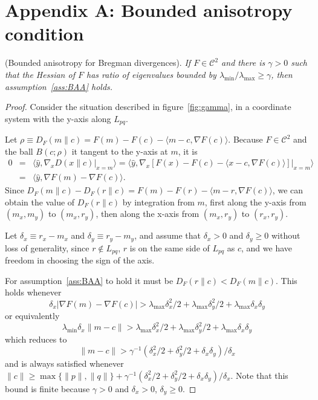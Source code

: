 \documentclass[11pt]{article}
\newcommand{\D}[2]{D\left(#1 \parallel #2\right)}
\begin{document}








\section*{Appendix A: Bounded anisotropy condition}\label{app:gamma}


 (Bounded anisotropy for Bregman divergences).
\emph{
If $F\in\mathcal{C}^2$ and there is $\gamma > 0$ such that the Hessian of $F$ has ratio of eigenvalues bounded by $\lambda_{\text{min}}/\lambda_{\text{max}}\ge \gamma$,
	then assumption~\ref{ass:BAA} holds. 
}\begin{proof}
Consider the situation described in figure~\ref{fig:gamma}, 
	in a coordinate system with the y-axis along $L_{pq}$. 

Let $\rho\equiv D_F(m\parallel c) = F(m)-F(c)-\langle m-c,\nabla F(c)\rangle$. 
Because $F\in\mathcal{C}^2$ and the ball $B(c;\rho)$ it tangent to the y-axis at $m$, 
	it is 
\begin{eqnarray*}
	0 &=& \langle \hat{y}, \nabla_x \D{x}{c}\bigg|_{x=m}\rangle = \langle \hat{y}, \nabla_x \left[ F(x) - F(c) - \langle x-c, \nabla F(c) \rangle \right]\bigg|_{x=m} \rangle \\
	   &=& \langle \hat{y}, \nabla F(m) - \nabla F(c) \rangle.
\end{eqnarray*}
Since $D_F(m\parallel c) - D_F(r\parallel c) = F(m)-F(r) - \langle m-r,\nabla F(c)\rangle$, 
we can obtain the value of $D_F(r\parallel c)$ by integration from $m$, first 
	along the y-axis from $(m_x,m_y)$ to $(m_x,r_y)$, 
	then along the x-axis from $(m_x,r_y)$ to $(r_x,r_y)$. 

Let $\delta_x\equiv r_x-m_x$ and $\delta_y\equiv r_y-m_y$, 
	and assume that $\delta_x> 0$ and $\delta_y\ge 0$ without loss of generality, 
	since $r\not\in L_{pq}$, $r$ is on the same side of $L_{pq}$ as $c$, 
	and we have freedom in choosing the sign of the axis. 

For assumption~\ref{ass:BAA} to hold it must be $D_F(r\parallel c) < D_F(m\parallel c)$. This holds whenever
\[
	\delta_x |\nabla F(m)-\nabla F(c)| > 
		\lambda_{\text{max}} \delta_x^2 / 2 + \lambda_{\text{max}}\delta_y^2 / 2 + \lambda_{\text{max}} \delta_x\delta_y
\]
or equivalently
\[
	\lambda_{\text{min}}\delta_x \|m - c\| > 
		\lambda_{\text{max}} \delta_x^2 / 2 + \lambda_{\text{max}}\delta_y^2 / 2 + \lambda_{\text{max}} \delta_x\delta_y
\]
which reduces to 
\[
	\|m-c\| > \gamma^{-1} \left( \delta_x^2/2 + \delta_y^2/2 + \delta_x\delta_y\right)/\delta_x
\]
and is always satisfied whenever $\|c\| \ge \max\{\|p\|,\|q\|\} + \gamma^{-1} \left( \delta_x^2/2 + \delta_y^2/2 + \delta_x\delta_y\right)/\delta_x$. 
Note that this bound is finite because $\gamma>0$ and $\delta_x>0$, $\delta_y\ge 0$. 
\end{proof}
\end{document}
